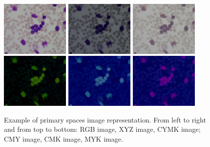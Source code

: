 \documentclass[final,a4paper,12pt,english]{UnicaPhdThesis3}
\begin{document}
\begin{figure}[!h]
	\centering
	\hspace{-2.6mm}
	\includegraphics[width=0.3\textwidth]{images/figcs_rgb}
	\includegraphics[width=0.3\textwidth]{images/figcs_xyz}
	\includegraphics[width=0.3\textwidth]{images/figcs_cmyk_all}
	\includegraphics[width=0.3\textwidth]{images/figcs_cmyk123}
	\includegraphics[width=0.3\textwidth]{images/figcs_cmyk124}
	\includegraphics[width=0.3\textwidth]{images/figcs_cmyk234}
	\caption{\label{fig:colour_spaces}Example of primary spaces image representation. From left to right and from top to bottom: RGB image, XYZ image, CYMK image; CMY image, CMK image, MYK image.}
\end{figure}
\end{document}
